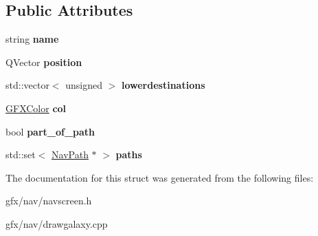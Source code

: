 \subsection*{Public Attributes}
\begin{DoxyCompactItemize}
\item 
string {\bfseries name}\hypertarget{structNavigationSystem_1_1CachedSystemIterator_1_1SystemInfo_a94c788c8911626ec7913e09c426010f2}{}\label{structNavigationSystem_1_1CachedSystemIterator_1_1SystemInfo_a94c788c8911626ec7913e09c426010f2}

\item 
Q\+Vector {\bfseries position}\hypertarget{structNavigationSystem_1_1CachedSystemIterator_1_1SystemInfo_a28c200c630d2455ddf6c3a4a63886286}{}\label{structNavigationSystem_1_1CachedSystemIterator_1_1SystemInfo_a28c200c630d2455ddf6c3a4a63886286}

\item 
std\+::vector$<$ unsigned $>$ {\bfseries lowerdestinations}\hypertarget{structNavigationSystem_1_1CachedSystemIterator_1_1SystemInfo_a479c7dcd1954e42be0924ae6229e58ad}{}\label{structNavigationSystem_1_1CachedSystemIterator_1_1SystemInfo_a479c7dcd1954e42be0924ae6229e58ad}

\item 
\hyperlink{structGFXColor}{G\+F\+X\+Color} {\bfseries col}\hypertarget{structNavigationSystem_1_1CachedSystemIterator_1_1SystemInfo_a7de9e0fce21e8d7cba5e4106b756dbb1}{}\label{structNavigationSystem_1_1CachedSystemIterator_1_1SystemInfo_a7de9e0fce21e8d7cba5e4106b756dbb1}

\item 
bool {\bfseries part\+\_\+of\+\_\+path}\hypertarget{structNavigationSystem_1_1CachedSystemIterator_1_1SystemInfo_a839336277a2fcead4c21f1d116519cea}{}\label{structNavigationSystem_1_1CachedSystemIterator_1_1SystemInfo_a839336277a2fcead4c21f1d116519cea}

\item 
std\+::set$<$ \hyperlink{classNavPath}{Nav\+Path} $\ast$ $>$ {\bfseries paths}\hypertarget{structNavigationSystem_1_1CachedSystemIterator_1_1SystemInfo_a95f486d359992c1ff9dcd65f145d563b}{}\label{structNavigationSystem_1_1CachedSystemIterator_1_1SystemInfo_a95f486d359992c1ff9dcd65f145d563b}

\end{DoxyCompactItemize}


The documentation for this struct was generated from the following files\+:\begin{DoxyCompactItemize}
\item 
gfx/nav/navscreen.\+h\item 
gfx/nav/drawgalaxy.\+cpp\end{DoxyCompactItemize}
